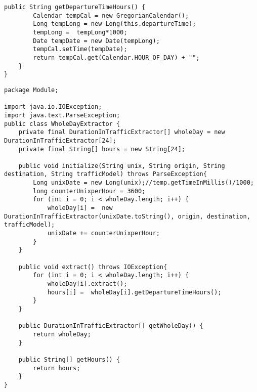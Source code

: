\begin{lstlisting}[caption= DurationInTrafficExtractor.java]
    public String getDepartureTimeHours() {
        Calendar tempCal = new GregorianCalendar();
        Long tempLong = new Long(this.departureTime);
        tempLong =  tempLong*1000;
        Date tempDate = new Date(tempLong);
        tempCal.setTime(tempDate);
        return tempCal.get(Calendar.HOUR_OF_DAY) + "";
    }
}
\end{lstlisting}

\begin{lstlisting}[caption= WholeDayExtractor.java]
package Module;

import java.io.IOException;
import java.text.ParseException;
public class WholeDayExtractor {
    private final DurationInTrafficExtractor[] wholeDay = new DurationInTrafficExtractor[24];
    private final String[] hours = new String[24];
    
    public void initialize(String unix, String origin, String destination, String trafficModel) throws ParseException{
        Long unixDate = new Long(unix);//temp.getTimeInMillis()/1000;
        long counterUnixperHour = 3600;
        for (int i = 0; i < wholeDay.length; i++) {
            wholeDay[i] =  new DurationInTrafficExtractor(unixDate.toString(), origin, destination, trafficModel);
            unixDate += counterUnixperHour;
        }
    }
    
    public void extract() throws IOException{
        for (int i = 0; i < wholeDay.length; i++) {
            wholeDay[i].extract();
            hours[i] =  wholeDay[i].getDepartureTimeHours();
        }
    }

    public DurationInTrafficExtractor[] getWholeDay() {
        return wholeDay;
    }

    public String[] getHours() {
        return hours;
    }
}
\end{lstlisting}

